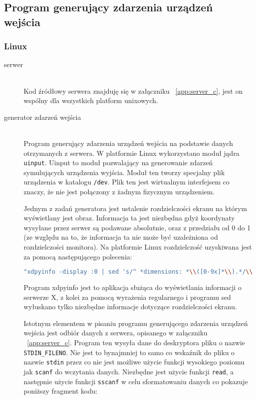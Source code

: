 \subsection{Program generujący zdarzenia urządzeń wejścia}
\label{sub:impl-displayclient-events-dispatcher}

\subsubsection{Linux}

\begin{description}
	\item[serwer] \hfill \\
Kod źródłowy serwera znajduję się w załączniku ~\ref{app:server_c}, jest on wspólny dla wszystkich platform unixowych.		
	\item[generator zdarzeń wejścia] \hfill \\ 
		Program generujący zdarzenia urządzeń wejścia na podstawie danych otrzymanych z serwera. W platformie Linux wykorzystano moduł jądra \lstinline{uinput}. Uinput to moduł pozwalający na generowanie zdarzeń symulujących urządzenia wyjścia. Moduł ten tworzy specjalny plik urządzenia w katalogu \lstinline{/dev}. Plik ten jest wirtualnym interfejsem co znaczy, że nie jest połączony z żadnym fizycznym urządzeniem.

		Jednym z zadań generatora jest ustalenie rozdzielczości ekranu na którym wyświetlany jest obraz. Informacja ta jest niezbędna gdyż koordynaty wysyłane przez serwer są podawane absolutnie, oraz z przedziału od 0 do 1 (ze względu na to, że informacja ta nie może być uzależniona od rozdzielczości monitora). Na platformie Linux rozdzielczość uzyskiwana jest za pomocą następującego polecenia:
\begin{lstlisting}[language=bash]
"xdpyinfo -display :0 | sed 's/^ *dimensions: *\\([0-9x]*\\).*/\\1/;t;d'";
\end{lstlisting}
		Program xdpyinfo jest to aplikacja służąca do wyświetlania informacji o serwerze X, z kolei za pomocą wyrażenia regularnego i programu sed wyłuskano tylko niezbędne informacje dotyczące rozdzielczości ekranu.

		Istotnym elementem w pisaniu programu generującego zdarzenia urządzeń wejścia jest odbiór danych z serwera, opisanego w załączniku ~\ref{app:server_c}. Program ten wysyła dane do deskryptora pliku o nazwie \lstinline{STDIN_FILENO}. Nie jest to bynajmniej to samo co wskaźnik do pliku o nazwie \lstinline{stdin} przez co nie jest możliwe użycie funkcji wysokiego poziomu jak \lstinline{scanf} do wczytania danych. Niezbędne jest użycie funkcji \lstinline{read}, a następnie użycie funkcji \lstinline{sscanf} w celu sformatowaniu danych co pokazuje poniższy fragment kodu:


\end{description}
